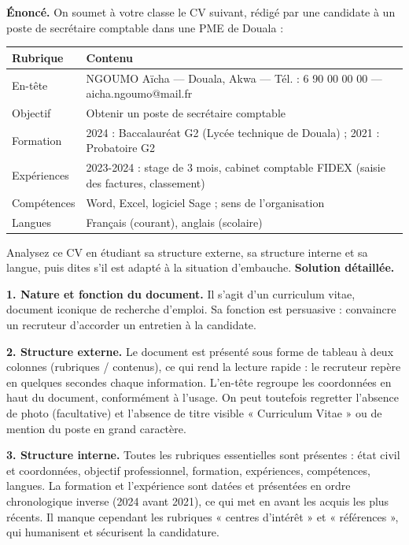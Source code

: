 \documentclass[11pt]{article}
\newcommand{\cle}[1]{{\popxbold\color{popdark}#1}}
\begin{document}
\begin{exoresolu}
\textbf{Énoncé.} On soumet à votre classe le CV suivant, rédigé par une candidate à un poste de secrétaire comptable dans une PME de Douala :

\begin{center}
\begin{tabularx}{\linewidth}{|l|X|}
\hline
\rowcolor{popblueL} \textbf{Rubrique} & \textbf{Contenu} \\
\hline
En-tête & NGOUMO Aïcha — Douala, Akwa — Tél. : 6 90 00 00 00 — aicha.ngoumo@mail.fr \\
\hline
Objectif & Obtenir un poste de secrétaire comptable \\
\hline
Formation & 2024 : Baccalauréat G2 (Lycée technique de Douala) ; 2021 : Probatoire G2 \\
\hline
Expériences & 2023-2024 : stage de 3 mois, cabinet comptable FIDEX (saisie des factures, classement) \\
\hline
Compétences & Word, Excel, logiciel Sage ; sens de l'organisation \\
\hline
Langues & Français (courant), anglais (scolaire) \\
\hline
\end{tabularx}
\end{center}

Analysez ce CV en étudiant sa structure externe, sa structure interne et sa langue, puis dites s'il est adapté à la situation d'embauche.
\tcblower
\textbf{Solution détaillée.}

\textbf{1. Nature et fonction du document.} Il s'agit d'un curriculum vitae, document iconique de recherche d'emploi. Sa fonction est persuasive : convaincre un recruteur d'accorder un entretien à la candidate.

\textbf{2. Structure externe.} Le document est présenté sous forme de tableau à deux colonnes (rubriques / contenus), ce qui rend la lecture rapide : le recruteur repère en quelques secondes chaque information. L'en-tête regroupe les coordonnées en haut du document, conformément à l'usage. On peut toutefois regretter l'absence de photo (facultative) et l'absence de titre visible « Curriculum Vitae » ou de mention du poste en grand caractère.

\textbf{3. Structure interne.} Toutes les rubriques essentielles sont présentes : état civil et coordonnées, objectif professionnel, formation, expériences, compétences, langues. La formation et l'expérience sont datées et présentées en \cle{ordre chronologique inverse} (2024 avant 2021), ce qui met en avant les acquis les plus récents. Il manque cependant les rubriques « centres d'intérêt » et « références », qui humanisent et sécurisent la candidature.


\end{exoresolu}
\end{document}
